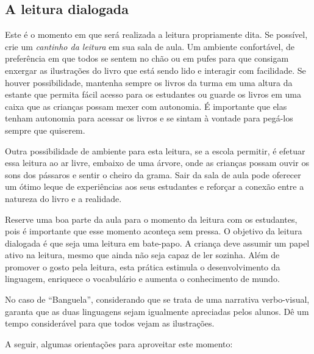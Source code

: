 \documentclass[11pt]{extarticle}
\begin{document}
\subsection{A leitura dialogada}
Este é o momento em que será realizada a leitura propriamente dita. 
Se possível, crie um \textit{cantinho da leitura} em sua sala de aula. Um 
ambiente confortável, de preferência em que todos se sentem no chão ou 
em pufes para que consigam enxergar as ilustrações do livro que está 
sendo lido e interagir com facilidade. Se houver possibilidade, mantenha 
sempre os livros da turma em uma altura da estante que permita fácil 
acesso para os estudantes ou guarde os livros em uma caixa que as crianças 
possam mexer com autonomia. É importante que elas tenham autonomia para 
acessar os livros e se sintam à vontade para pegá-los sempre que quiserem. 

Outra possibilidade de ambiente para esta leitura, se a escola permitir, 
é efetuar essa leitura ao ar livre, embaixo de uma árvore, onde as crianças 
possam ouvir os sons dos pássaros e sentir o cheiro da grama. Sair da sala 
de aula pode oferecer um ótimo leque de experiências aos seus estudantes e 
reforçar a conexão entre a natureza do livro e a realidade.  

Reserve uma boa parte da aula para o momento da leitura com os estudantes, 
pois é importante que esse momento aconteça sem pressa. O objetivo da 
leitura dialogada é que seja uma leitura em bate-papo. A criança deve 
assumir um papel ativo na leitura, mesmo que ainda não seja capaz de 
ler sozinha. Além de promover o gosto pela leitura, esta prática estimula 
o desenvolvimento da linguagem, enriquece o vocabulário e 
aumenta o conhecimento de mundo.

No caso de “Banguela”, considerando que se trata de uma narrativa
verbo-visual, garanta que as duas linguagens sejam igualmente
apreciadas pelos alunos. Dê um tempo considerável para que todos
vejam as ilustrações. 

A seguir, algumas orientações para aproveitar este momento: 
\end{document}

